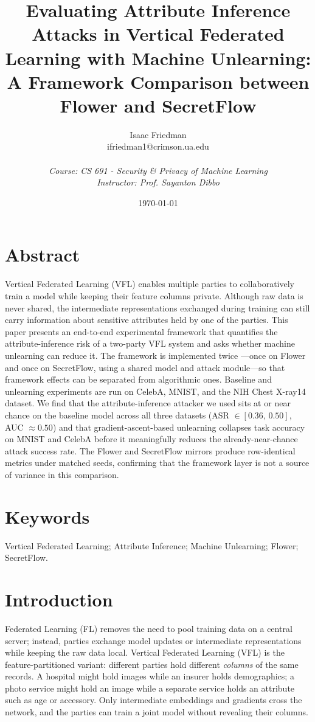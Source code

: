 \documentclass[letterpaper,twocolumn,10pt]{article}
\title{\textbf{Evaluating Attribute Inference Attacks in
Vertical Federated Learning with Machine Unlearning:
A Framework Comparison between Flower and SecretFlow}}
\author{
    Isaac Friedman \\
    ifriedman1@crimson.ua.edu \\
    \vspace{5pt} \\
    \textit{Course: CS 691 - Security \& Privacy of Machine Learning} \\
    \textit{Instructor: Prof. Sayanton Dibbo}
}
\date{\today}
\begin{document}
\maketitle

\section{Abstract}
Vertical Federated Learning (VFL) enables multiple parties to collaboratively
train a model while keeping their feature columns private. Although raw data
is never shared, the intermediate representations exchanged during training
can still carry information about sensitive attributes held by one of the
parties. This paper presents an end-to-end experimental framework that
quantifies the attribute-inference risk of a two-party VFL system and asks
whether machine unlearning can reduce it. The framework is implemented twice
---once on Flower and once on SecretFlow, using a shared model and attack
module---so that framework effects can be separated from algorithmic ones.
Baseline and unlearning experiments are run on CelebA, MNIST, and the NIH
Chest X-ray14 dataset. We find that the attribute-inference attacker we used
sits at or near chance on the baseline model across all three datasets
(ASR $\in [0.36,\,0.50]$, AUC $\approx 0.50$) and that gradient-ascent-based
unlearning collapses task accuracy on MNIST and CelebA before it meaningfully
reduces the already-near-chance attack success rate. The Flower and
SecretFlow mirrors produce row-identical metrics under matched seeds,
confirming that the framework layer is not a source of variance in this
comparison.

\section{Keywords}
Vertical Federated Learning; Attribute Inference; Machine Unlearning;
Flower; SecretFlow.

\section{Introduction}
Federated Learning (FL) removes the need to pool training data on a central
server; instead, parties exchange model updates or intermediate
representations while keeping the raw data local. Vertical Federated
Learning (VFL) is the feature-partitioned variant: different parties hold
different \emph{columns} of the same records. A hospital might hold images
while an insurer holds demographics; a photo service might hold an image
while a separate service holds an attribute such as age or accessory. Only
intermediate embeddings and gradients cross the network, and the parties
can train a joint model without revealing their columns.
\end{document}
